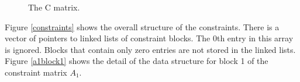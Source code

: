 \documentclass{article}
\begin{document}
\begin{figure}
\begin{center}
\caption{The C matrix.}
\label{cmat}
\end{center}
\end{figure}

Figure \ref{constraints} shows the overall structure of the constraints.  There
is a vector of pointers to linked lists of constraint blocks.  The 0th entry
in this array is ignored.  Blocks that contain only zero entries are not
stored in the linked lists.  Figure \ref{a1block1} shows the detail
of the data structure for block 1 of the constraint matrix $A_{1}$.     
\end{document}
